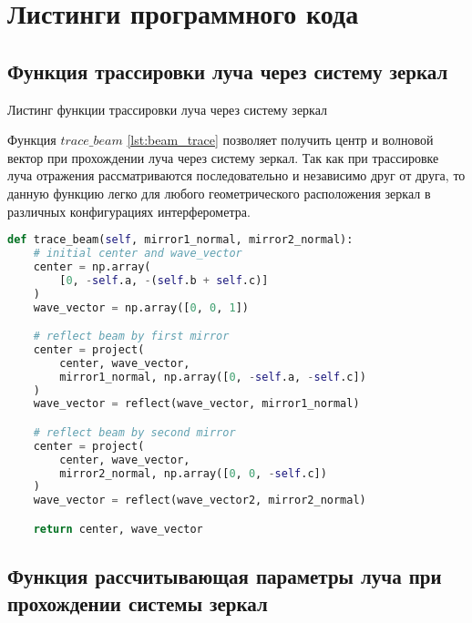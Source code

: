 \chapter{Листинги программного кода}\label{app:A}

\section{Функция трассировки луча через систему зеркал}\label{app:A1}

\begin{ListingEnv}[!h]%
\captiondelim{ } %
\caption{Листинг функции трассировки луча через систему зеркал}\label{lst:beam_trace}

Функция $trace\_beam$ \ref{lst:beam_trace} позволяет получить центр и волновой вектор при прохождении луча через систему зеркал. Так как при трассировке луча отражения рассматриваются последовательно и независимо друг от друга, то данную функцию легко для любого геометрического расположения зеркал в различных конфигурациях интерферометра.  


\begin{lstlisting}[language=Python]
def trace_beam(self, mirror1_normal, mirror2_normal):
    # initial center and wave_vector
    center = np.array(
        [0, -self.a, -(self.b + self.c)]
    )
    wave_vector = np.array([0, 0, 1])

    # reflect beam by first mirror
    center = project(
        center, wave_vector, 
        mirror1_normal, np.array([0, -self.a, -self.c])
    )
    wave_vector = reflect(wave_vector, mirror1_normal)

    # reflect beam by second mirror
    center = project(
        center, wave_vector, 
        mirror2_normal, np.array([0, 0, -self.c])
    )
    wave_vector = reflect(wave_vector2, mirror2_normal)

    return center, wave_vector
\end{lstlisting}
\end{ListingEnv}

\section{Функция рассчитывающая параметры луча при прохождении системы зеркал}\label{app:A2}

